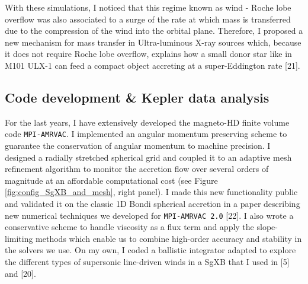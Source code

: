\documentclass[letterpaper,12pt,onecolumn]{article}
\newcommand{\sgx}{SgXB\xspace}
\begin{document}
With these simulations, I noticed that this regime known as wind - Roche lobe overflow was also associated to a surge of the rate at which mass is transferred due to the compression of the wind into the orbital plane. Therefore, I proposed a new mechanism for mass transfer in Ultra-luminous X-ray sources which, because it does not require Roche lobe overflow, explains how a small donor star like in M101 ULX-1 can feed a compact object accreting at a super-Eddington rate [21]. 

\subsection*{Code development \& Kepler data analysis}


\normalsize

For the last years, I have extensively developed the magneto-HD finite volume code \texttt{MPI-AMRVAC}. I implemented an angular momentum preserving scheme to guarantee the conservation of angular momentum to machine precision. I designed a radially stretched spherical grid and coupled it to an adaptive mesh refinement algorithm to monitor the accretion flow over several orders of magnitude at an affordable computational cost (see Figure\,\ref{fig:config_SgXB_and_mesh}, right panel). I made this new functionality public and validated it on the classic 1D Bondi spherical accretion in a paper describing new numerical techniques we developed for \texttt{MPI-AMRVAC 2.0} [22]. I also wrote a conservative scheme to handle viscosity as a flux term and apply the slope-limiting methods which enable us to combine high-order accuracy and stability in the solvers we use. On my own, I coded a ballistic integrator adapted to explore the different types of supersonic line-driven winds in a \sgx that I used in [5] and [20].
\end{document}
